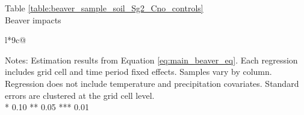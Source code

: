 \begin{table}[htb]
\captionlistentry[table]{}
\label{table:beaver_sample_soil_Sg2_Cno_controls}
\centering
Table \ref{table:beaver_sample_soil_Sg2_Cno_controls} \\
Beaver impacts \\
\begin{threeparttable}
\begin{tabulary}{\textwidth}{l*{9}{c}@{}}
\toprule \toprule
\noalign{\smallskip}
\noalign{\smallskip}
\midrule \bottomrule
\end{tabulary}
\medskip
\begin{tablenotes}[flushleft]
\setlength{}
\item
\footnotesize
\justify
Notes: Estimation results from Equation \eqref{eq:main_beaver_eq}.
Each regression includes grid cell and time period fixed effects.
Samples vary by column. Regression does not include temperature and precipitation covariates.
Standard errors are clustered at the grid cell level. \\
\mbox{*} 0.10 ** 0.05 *** 0.01
\end{tablenotes}
\end{threeparttable}
\end{table}
